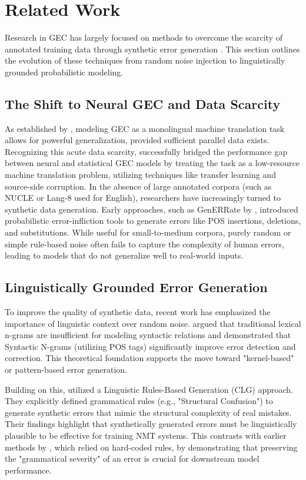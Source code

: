 \documentclass[11pt]{article}
\begin{document}
\section{Related Work}

Research in GEC has largely focused on methods to overcome the scarcity of annotated training data through synthetic error generation \cite{bryant-etal-2023-grammatical}. This section outlines the evolution of these techniques from random noise injection to linguistically grounded probabilistic modeling.

\subsection{The Shift to Neural GEC and Data Scarcity}
As established by \citet{yuan-2016}, modeling GEC as a monolingual machine translation task allows for powerful generalization, provided sufficient parallel data exists. Recognizing this acute data scarcity, \citet{junczys-dowmunt-etal-2018-approaching} successfully bridged the performance gap between neural and statistical GEC models by treating the task as a low-resource machine translation problem, utilizing techniques like transfer learning and source-side corruption. In the absence of large annotated corpora (such as NUCLE or Lang-8 used for English), researchers have increasingly turned to synthetic data generation. Early approaches, such as GenERRate by \citet{jennifer}, introduced probabilistic error-infliction tools to generate errors like POS insertions, deletions, and substitutions. While useful for small-to-medium corpora, purely random or simple rule-based noise often fails to capture the complexity of human errors, leading to models that do not generalize well to real-world inputs.

\subsection{Linguistically Grounded Error Generation}
To improve the quality of synthetic data, recent work has emphasized the importance of linguistic context over random noise. \citet{sidorov-2013} argued that traditional lexical n-grams are insufficient for modeling syntactic relations and demonstrated that Syntactic N-grams (utilizing POS tags) significantly improve error detection and correction. This theoretical foundation supports the move toward "kernel-based" or pattern-based error generation.

Building on this, \citet{ma-2022} utilized a Linguistic Rules-Based Generation (CLG) approach. They explicitly defined grammatical rules (e.g., "Structural Confusion") to generate synthetic errors that mimic the structural complexity of real mistakes. Their findings highlight that synthetically generated errors must be linguistically plausible to be effective for training NMT systems. This contrasts with earlier methods by \citet{jennifer}, which relied on hard-coded rules, by demonstrating that preserving the "grammatical severity" of an error is crucial for downstream model performance.
\end{document}
